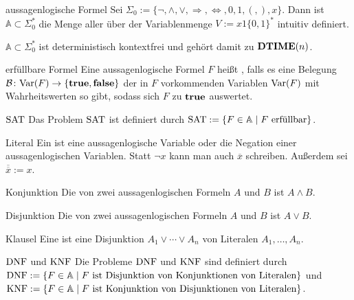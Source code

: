 \begin{Def}{aussagenlogische Formel}
    Sei $\Sigma_0 := \{\lnot, \land, \lor, \Rightarrow, \Leftrightarrow, 0, 1,
    (, ), x\}$.
    Dann ist $\mathbb{A} \subset \Sigma_0^\ast$ die Menge aller 
    über der Variablenmenge $V := x1\{0, 1\}^\ast$ intuitiv definiert.
\end{Def}

\begin{Bem}
    $\mathbb{A} \subset \Sigma_0^\ast$ ist deterministisch kontextfrei
    und gehört damit zu $\mathbf{DTIME}(n)$.
\end{Bem}

\begin{Def}{erfüllbare Formel}
    Eine aussagenlogische Formel $F$ heißt ,
    falls es eine Belegung $\mathcal{B}\colon \text{Var}(F) \rightarrow \{\mathbf{true}, \mathbf{false}\}$
    der in $F$ vorkommenden Variablen $\text{Var}(F)$ mit Wahrheitswerten so gibt,
    sodass sich $F$ zu $\mathbf{true}$ auswertet.
\end{Def}

\begin{Def}{$\text{SAT}$}
    Das Problem $\text{SAT}$ ist definiert durch
    $\text{SAT} := \{F \in \mathbb{A} \;|\; F \text{ erfüllbar}\}$.
\end{Def}

\linie

\begin{Def}{Literal}
    Ein  ist eine aussagenlogische Variable
    oder die Negation einer aussagenlogischen Variablen.
    Statt $\lnot x$ kann man auch $\overline{x}$ schreiben.
    Außerdem sei $\overline{\overline{x}} := x$.
\end{Def}

\begin{Def}{Konjunktion}
    Die  von zwei aussagenlogischen Formeln $A$ und $B$ ist
    $A \land B$.
\end{Def}

\begin{Def}{Disjunktion}
    Die  von zwei aussagenlogischen Formeln $A$ und $B$ ist
    $A \lor B$.
\end{Def}

\begin{Def}{Klausel}
    Eine  ist eine Disjunktion $A_1 \lor \dotsb \lor A_n$
    von Literalen $A_1, \dotsc, A_n$.
\end{Def}

\begin{Def}{$\text{DNF}$ und $\text{KNF}$}
    Die Probleme $\text{DNF}$ und $\text{KNF}$ sind definiert durch\\
    $\text{DNF} := \{F \in \mathbb{A} \;|\;
    F \text{ ist Disjunktion von Konjunktionen von Literalen}\}$ und\\
    $\text{KNF} := \{F \in \mathbb{A} \;|\;
    F \text{ ist Konjunktion von Disjunktionen von Literalen}\}$.
\end{Def}

